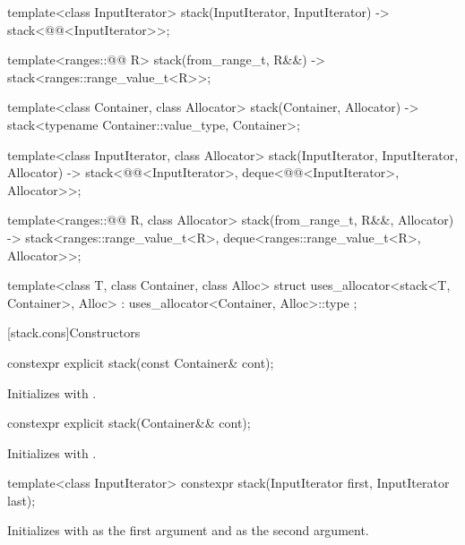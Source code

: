 \begin{codeblock}
{  template<class InputIterator>
    stack(InputIterator, InputIterator) -> stack<@@<InputIterator>>;

  template<ranges::@@ R>
    stack(from_range_t, R&&) -> stack<ranges::range_value_t<R>>;

  template<class Container, class Allocator>
    stack(Container, Allocator) -> stack<typename Container::value_type, Container>;

  template<class InputIterator, class Allocator>
    stack(InputIterator, InputIterator, Allocator)
      -> stack<@@<InputIterator>, deque<@@<InputIterator>,
               Allocator>>;

  template<ranges::@@ R, class Allocator>
    stack(from_range_t, R&&, Allocator)
      -> stack<ranges::range_value_t<R>, deque<ranges::range_value_t<R>, Allocator>>;

  template<class T, class Container, class Alloc>
    struct uses_allocator<stack<T, Container>, Alloc>
      : uses_allocator<Container, Alloc>::type { };
}
\end{codeblock}

[stack.cons]{Constructors}

%
\begin{itemdecl}
constexpr explicit stack(const Container& cont);
\end{itemdecl}

\begin{itemdescr}
\pnum
\effects
Initializes  with .
\end{itemdescr}

%
\begin{itemdecl}
constexpr explicit stack(Container&& cont);
\end{itemdecl}

\begin{itemdescr}
\pnum
\effects
Initializes  with .
\end{itemdescr}

%
\begin{itemdecl}
template<class InputIterator>
  constexpr stack(InputIterator first, InputIterator last);
\end{itemdecl}

\begin{itemdescr}
\pnum
\effects
Initializes  with
 as the first argument and  as the second argument.
\end{itemdescr}

